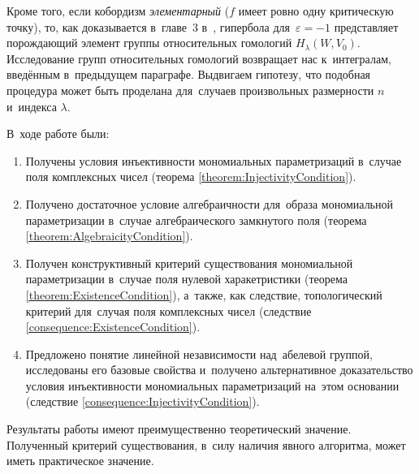\documentclass[a4paper,oneside]{article}
\begin{document}
Кроме того, если кобордизм \textit{элементарный} ($f$ имеет ровно одну критическую точку), то, как доказывается
в~главе~3 в~\cite{Mil65}, гипербола для~$\varepsilon = -1$ представляет порождающий элемент группы относительных
гомологий $H_\lambda(W, V_0)$. Исследование групп относительных гомологий возвращает нас к~интегралам, введённым
в~предыдущем параграфе. Выдвигаем гипотезу, что подобная процедура может быть проделана для~случаев произвольных
размерности $n$ и~индекса $\lambda$.

\pagebreak
{}
В~ходе работе были:
\begin{enumerate}
  \item Получены условия инъективности мономиальных параметризаций в~случае поля комплексных чисел (теорема \ref{theorem:InjectivityCondition}).
  \item Получено достаточное условие алгебраичности для~образа мономиальной параметризации
        в~случае алгебраического замкнутого поля (теорема \ref{theorem:AlgebraicityCondition}).
  \item Получен конструктивный критерий существования мономиальной параметризации
        в~случае поля нулевой харакетристики (теорема \ref{theorem:ExistenceCondition}), а~также,
        как следствие, топологический критерий для~случая поля комплексных чисел (следствие \ref{consequence:ExistenceCondition}).
  \item Предложено понятие линейной независимости над~абелевой группой, исследованы его базовые свойства
        и~получено альтернативное доказательство условия инъективности мономиальных параметризаций
        на~этом основании (следствие \ref{consequence:InjectivityCondition}).
\end{enumerate}

Результаты работы имеют преимущественно теоретический значение. Полученный критерий существования,
в~силу наличия явного алгоритма, может иметь практическое значение.

\pagebreak
\end{document}
